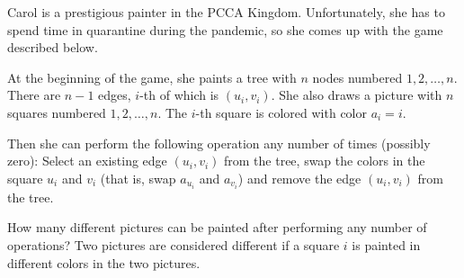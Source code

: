 Carol is a prestigious painter in the PCCA Kingdom.
Unfortunately, she has to spend time in quarantine during the pandemic, so she comes up with the game described below.

At the beginning of the game, she paints a tree with $n$ nodes numbered $1,2,\ldots,n$.
There are $n-1$ edges, $i$-th of which is $(u_i,v_i)$.
She also draws a picture with $n$ squares numbered $1,2,\ldots,n$.
The $i$-th square is colored with color $a_i = i$.

Then she can perform the following operation any number of times (possibly zero):
Select an existing edge $(u_i,v_i)$ from the tree, swap the colors in the square $u_i$ and $v_i$ (that is, swap $a_{u_i}$ and $a_{v_i}$) and remove the edge $(u_i,v_i)$ from the tree.

How many different pictures can be painted after performing any number of operations?
Two pictures are considered different if a square $i$ is painted in different colors in the two pictures.